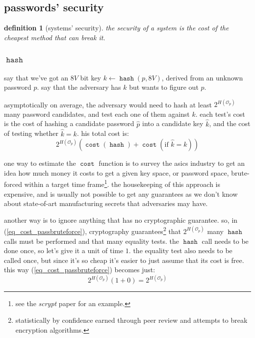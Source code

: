 \documentclass[twocolumn]{article}
\newtheorem{definition}{definition}[section]
\DeclareMathOperator{\hash}{\mathtt{hash}}
\DeclareMathOperator{\cost}{\mathtt{cost}}
\begin{document}
\subsection{passwords' security}
\begin{definition}[systems' security]\label{def_system_security}
the security of a system is the cost of the cheapest method that can break
it.
\end{definition}

\subsubsection{$\hash$}
say that we've got an $8V$ bit key $k \gets \hash(p, 8V)$, derived from an
unknown password $p$.  say that the adversary has $k$ but wants to figure
out $p$.

asymptotically on average, the adversary would need to hash at least
$2^{H(\mathcal{O}_p)}$ many password candidates, and test each one of them
against $k$.  each test's cost is the cost of hashing a candidate password
$\hat p$ into a candidate key $\hat k$, and the cost of testing whether
$\hat k = k$.  his total cost is:
\begin{equation}\label{eq_cost_passbruteforce}
    2^{H(\mathcal{O}_p)} \left(
        \cost(\hash) + \cost(\text{if } \hat k = k)
    \right)
\end{equation}

one way to estimate the $\cost$ function is to survey the asics industry to
get an idea how much money it costs to get a given key space, or password
space, brute-forced within a target time frame\footnote{see the
\emph{scrypt} paper for an example.}.  the housekeeping of this approach is
expensive, and is usually not possible to get any guarantees as we don't
know about state-of-art manufacturing secrets that adversaries may have.

another way is to ignore anything that has no cryptographic guarantee.  so,
in (\ref{eq_cost_passbruteforce}), cryptography
guarantees\footnote{statistically by confidence earned through peer review
and attempts to break encryption algorithms.} that $2^{H(\mathcal{O}_p)}$
many $\hash$ calls must be performed and that many equality tests.  the
$\hash$ call needs to be done once, so let's give it a unit of time $1$.
the equality test also needs to be called once, but since it's so cheap
it's easier to just assume that its cost is free.  this way
(\ref{eq_cost_passbruteforce}) becomes just:
\begin{equation}\label{eq_simplecost_passbruteforce}
    2^{H(\mathcal{O}_p)} (1+0) = 2^{H(\mathcal{O}_p)}
\end{equation}
\end{document}
